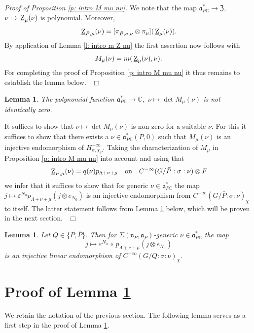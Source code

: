 \documentclass[12pt,a4paper]{article}
\newtheorem{Lemma}[Thm]{Lemma}
\newenvironment{lemma}[0]{\begin{Lemma}\noindent}%
{\end{Lemma}}
\def\proof{\par\noindent{\it Proof.}{\ }{\ }}
\def\qed{~\hfill\hbox{$\Box$}\medbreak}
\def\msy#1{{\mathbb #1}}
\def\C{{\msy C}}
\def\ge{\varepsilon}
\def\gs{\sigma}
\def\gS{\Sigma}
\def\got#1{\mathfrak #1}
\def\fa{{\got a}}
\def\fn{{\got n}}
\def\to{\rightarrow}
\def\after{\,{\scriptstyle\circ}\,}
\def\iC{{\scriptscriptstyle \C}}
\numberwithin{Thm}{section}
\numberwithin{equation}{section}
\def\fZ{{\mathfrak Z}}
\def\faPdc{{\fa_{P\iC}^*}}
\def\gL{\Lambda}
\numberwithin{equation}{section}
\def\fZ{{\mathfrak Z}}
\def\gL{\Lambda}
\def\faPdc{\fa_{P\iC}^*}
\def\ulZ{\, \underline{\rm Z}}
\def\cchi{\chi}
\begin{document}
{\em Proof of Proposition \ref{p: intro M mu nu}.}
We note that the map $\faPdc \to \fZ,$ $\nu \mapsto \ulZ_\mu(\nu)$ is polynomial. Moreover, 
$$ 
\ulZ_{\bar P, \mu}(\nu) = [\pi_{\bar P, \gs, \nu}  \otimes \pi_\mu](\ulZ_\mu(\nu)).
$$%
By application of Lemma \ref{l: intro m Z nu} the first assertion now follows with 
$$ 
M_\mu(\nu) = m(\ulZ_{\mu}(\nu), \nu).
$$%
For completing the proof of Proposition \ref{p: intro M mu nu} it thus remains to establish the lemma below.
\qed

\begin{lemma}
\label{l: det M mu not zero}
The polynomial  function $\faPdc \to \C,$ $ \nu \mapsto \det M_\mu(\nu)$ is not identically zero.
\end{lemma}

\proof
It suffices to show that $\nu \mapsto \det M_\mu(\nu)$ is non-zero for a suitable $\nu.$ 
For this it suffices to show that there exists a $\nu \in \faPdc(P,0)$ 
such that $M_\mu(\nu)$ is an injective endomorphism of $H_{\gs, \cchi_P}^{-\infty}.$  
Taking the characterization of $M_\mu$ in Proposition \ref{p: intro M mu nu} into account 
and using that 
\begin{equation}
\label{e: Z q p}
\ulZ_{\bar P, \mu}(\nu) = q(\nu) p_{\gL+ \nu + \mu} \quad {\rm on} \quad C^{-\infty}(G/\bar P: \gs: \nu) \otimes F
\end{equation}
we infer that it suffices to show that for generic $\nu \in \faPdc$ the map 
$j \mapsto \ge^{N_0} p_{\gL + \nu +\mu} (j \otimes e_{N_0})$
is an injective endomorphism from $C^{-\infty}(G/\bar P : \gs: \nu)_\cchi$ to itself. 
The latter statement follows from Lemma  \ref{l: generic injectivity of map with j} below, which will be proven in the next section. 
\qed
\begin{lemma}
\label{l: generic injectivity of map with j}
Let $Q \in \{ P, \bar P\}.$ Then for $\gS(\fn_P,\fa_P)$-generic $\nu \in \faPdc$ the map 
\begin{equation}
\label{e: j to e after proj j}
j \mapsto \ge^{N_0} \after p_{\gL + \nu + \mu} ( j \otimes e_{N_0})
\end{equation} 
is an injective linear endomorphism of $C^{-\infty}(G/Q: \gs:\nu)_\cchi.$ 
\end{lemma}

\section{Proof of Lemma \ref{l: generic injectivity of map with j}}
We retain the notation of the previous section. 
The following lemma serves as a first step in the proof of Lemma \ref{l: generic injectivity of map with j}.
 
\end{document}
